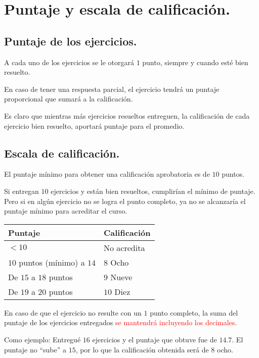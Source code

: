 \section{Puntaje y escala de calificación.}
\subsection{Puntaje de los ejercicios.}

A cada uno de los ejercicios se le otorgará $1$ punto, siempre y cuando esté bien resuelto.
\par
En caso de tener una respuesta parcial, el ejercicio tendrá un puntaje proporcional que sumará a la calificación.
\par
Es claro que mientras más ejercicios resueltos entreguen, la calificación de cada ejercicio bien resuelto, aportará puntaje para el promedio.

\subsection{Escala de calificación.}

El puntaje mínimo para obtener una calificación aprobatoria es de $10$ puntos.
\par
Si entregan $10$ ejercicios y están bien resueltos, cumplirían el mínimo de puntaje.  Pero si en algún ejercicio no se logra el punto completo, ya no se alcanzaría el puntaje mínimo para acreditar el curso.

\begin{table}[H]
\Large
\centering
\begin{tabular}{l | l}
Puntaje & Calificación \\ \hline
$< 10$ & No acredita \\ 
$10$ puntos (mínimo) a $14$ & $8$ Ocho \\ 
De $15$  a $18$ puntos & $9$ Nueve \\ 
De $19$  a $20$ puntos & $10$ Diez \\
\end{tabular}
\end{table}

En caso de que el ejercicio no resulte con un $1$ punto completo, la suma del puntaje de los ejercicios entregados \textcolor{red}{se mantendrá incluyendo los decimales}.
\par

Como ejemplo: Entregué $16$ ejercicios y el puntaje que obtuve fue de $14.7$.  El puntaje no \enquote{sube} a $15$, por lo que la calificación obtenida será de $8$ ocho.

